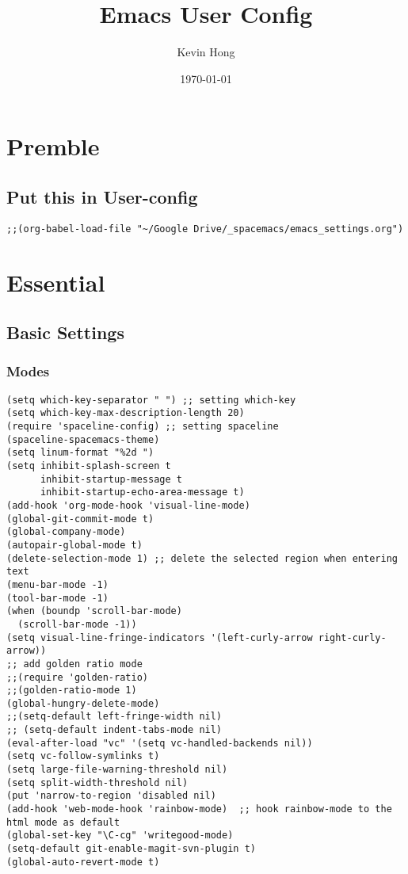 \documentclass[11pt]{article}
\author{Kevin Hong}
\date{\today}
\title{Emacs User Config}
\begin{document}
\maketitle
\tableofcontents


\section{Premble}
\label{sec:orgheadline2}
\subsection{Put this in User-config}
\label{sec:orgheadline1}
\begin{verbatim}
;;(org-babel-load-file "~/Google Drive/_spacemacs/emacs_settings.org")
\end{verbatim}
\section{Essential}
\label{sec:orgheadline30}
\subsection{Basic Settings}
\label{sec:orgheadline21}
\subsubsection{Modes}
\label{sec:orgheadline3}
\begin{verbatim}
(setq which-key-separator " ") ;; setting which-key
(setq which-key-max-description-length 20)
(require 'spaceline-config) ;; setting spaceline
(spaceline-spacemacs-theme)
(setq linum-format "%2d ")
(setq inhibit-splash-screen t
      inhibit-startup-message t
      inhibit-startup-echo-area-message t)
(add-hook 'org-mode-hook 'visual-line-mode)
(global-git-commit-mode t)
(global-company-mode)
(autopair-global-mode t)
(delete-selection-mode 1) ;; delete the selected region when entering text
(menu-bar-mode -1)
(tool-bar-mode -1)
(when (boundp 'scroll-bar-mode)
  (scroll-bar-mode -1))
(setq visual-line-fringe-indicators '(left-curly-arrow right-curly-arrow))
;; add golden ratio mode
;;(require 'golden-ratio)
;;(golden-ratio-mode 1)
(global-hungry-delete-mode)
;;(setq-default left-fringe-width nil)
;; (setq-default indent-tabs-mode nil)
(eval-after-load "vc" '(setq vc-handled-backends nil))
(setq vc-follow-symlinks t)
(setq large-file-warning-threshold nil)
(setq split-width-threshold nil)
(put 'narrow-to-region 'disabled nil)
(add-hook 'web-mode-hook 'rainbow-mode)  ;; hook rainbow-mode to the html mode as default
(global-set-key "\C-cg" 'writegood-mode)
(setq-default git-enable-magit-svn-plugin t)
(global-auto-revert-mode t)
\end{verbatim}
\end{document}
